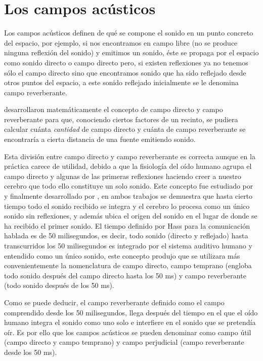 \section{Los campos acústicos}
  
Los campos acústicos definen de qué se compone el sonido en un punto concreto del espacio, por ejemplo, si nos encontramos en campo libre (no se produce ninguna reflexión del sonido) y emitimos un sonido, éste se propaga por el espacio como sonido directo o campo directo pero, si existen reflexiones ya no tenemos sólo el campo directo sino que encontramos sonido que ha sido reflejado desde otros puntos del espacio, a este sonido reflejado inicialmente se le denomina campo reverberante. 
 
\cite{Hopkins1948} desarrollaron matemáticamente el concepto de campo directo y campo reverberante para que, conociendo ciertos factores de un recinto, se pudiera calcular cuánta \textit{cantidad} de campo directo y cuánta de campo reverberante se encontraría a cierta distancia de una fuente emitiendo sonido.
 
Esta división entre campo directo y campo reverberante es correcta aunque en la práctica carece de utilidad, debido a que la fisiología del oído humano agrupa el campo directo y algunas de las primeras reflexiones haciendo creer a nuestro cerebro que todo ello constituye un solo sonido. Este concepto fue estudiado por \cite{Wallach1949} y finalmente desarrollado por \cite{Haas1949}, en ambos trabajos se demuestra que hasta cierto tiempo todo el sonido recibido se integra y el cerebro lo procesa como un único sonido sin reflexiones, y además ubica el origen del sonido en el lugar de donde se ha recibido el primer sonido. El tiempo definido por Hass para la comunicación hablada es de 50 milisegundos, es decir, todo sonido (directo y reflejado) hasta transcurridos los 50 milisegundos es integrado por el sistema auditivo humano y entendido como un único sonido, este concepto produjo que se utilizara más convenientemente la nomenclatura de campo directo, campo temprano (engloba todo sonido después del campo directo hasta los 50 ms) y campo reverberante (todo sonido después de los 50 ms).
 
Como se puede deducir, el campo reverberante definido como el campo comprendido desde los 50 milisegundos, llega después del tiempo en el que el oído humano integra el sonido como uno solo e interfiere en el sonido que se pretendía oír. Es por ello que los campos acústicos se pueden denominar como campo útil (campo directo y campo temprano) y campo perjudicial (campo reverberante desde los 50 ms).
 

